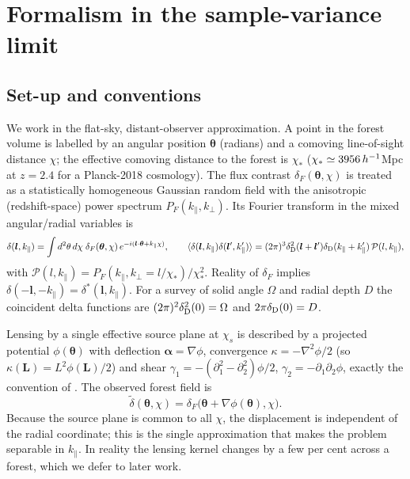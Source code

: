 \documentclass[11pt,a4paper]{article}
\newcommand{\dF}{\delta_F}
\newcommand{\dt}{\tilde\delta}
\newcommand{\vl}{\bm{l}}
\newcommand{\vL}{\bm{L}}
\newcommand{\vth}{\bm{\theta}}
\newcommand{\kpar}{k_\parallel}
\newcommand{\PP}{\mathcal{P}}
\newcommand{\dD}{\delta_{\rm D}}
\begin{document}
\section{Formalism in the sample-variance limit}
\label{sec:formalism}

\subsection{Set-up and conventions}

We work in the flat-sky, distant-observer approximation. A point in the forest volume is labelled by an angular position $\vth$ (radians) and a comoving line-of-sight distance $\chi$; the effective comoving distance to the forest is $\chi_*$ ($\chi_*\simeq3956\,h^{-1}$Mpc at $z=2.4$ for a Planck-2018 cosmology). The flux contrast $\dF(\vth,\chi)$ is treated as a statistically homogeneous Gaussian random field with the anisotropic (redshift-space) power spectrum $P_F(\kpar,k_\perp)$. Its Fourier transform in the mixed angular/radial variables is
\begin{equation}
\delta(\vl,\kpar)=\int d^2\theta\,d\chi\;\dF(\vth,\chi)\,e^{-i(\vl\cdot\vth+\kpar\chi)},\qquad
\langle\delta(\vl,\kpar)\delta(\vl',\kpar')\rangle=(2\pi)^3\dD^2(\vl+\vl')\dD(\kpar+\kpar')\,\PP(l,\kpar),
\label{eq:power}
\end{equation}
with $\PP(l,\kpar)=P_F(\kpar,k_\perp=l/\chi_*)/\chi_*^2$. Reality of $\dF$ implies $\delta(-\vl,-\kpar)=\delta^*(\vl,\kpar)$. For a survey of solid angle $\Omega$ and radial depth $D$ the coincident delta functions are $(2\pi)^2\dD^2(0)=\Omega$ and $2\pi\dD(0)=D$.

Lensing by a single effective source plane at $\chi_s$ is described by a projected potential $\phi(\vth)$ with deflection $\bm\alpha=\nabla\phi$, convergence $\kappa=-\nabla^2\phi/2$ (so $\kappa(\vL)=L^2\phi(\vL)/2$) and shear $\gamma_1=-(\partial_1^2-\partial_2^2)\phi/2$, $\gamma_2=-\partial_1\partial_2\phi$, exactly the convention of \citet{astro-ph/0111606}. The observed forest field is
\begin{equation}
\dt(\vth,\chi)=\dF\big(\vth+\nabla\phi(\vth),\chi\big).
\label{eq:lensed}
\end{equation}
Because the source plane is common to all $\chi$, the displacement is independent of the radial coordinate; this is the single approximation that makes the problem separable in $\kpar$. In reality the lensing kernel changes by a few per cent across a forest, which we defer to later work.
\end{document}
